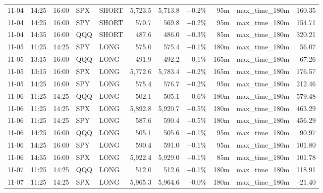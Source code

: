 \documentclass[11pt,a4paper,twoside]{article}
\begin{document}
\begin{center}
\begin{longtable}{>{\color{txtmain}}l l l l l r r r r >{\color{txtmain}}l r}
11-04 & 14:25 & 16:00 & SPX & SHORT & 5,723.5 & 5,713.8 & \textcolor{wingreen}{+0.2\%} & 95m & max\_time\_180m & \textcolor{wingreen}{160.35} \\
11-04 & 14:25 & 16:00 & SPY & SHORT & 570.7 & 569.8 & \textcolor{wingreen}{+0.2\%} & 95m & max\_time\_180m & \textcolor{wingreen}{154.71} \\
11-04 & 14:35 & 16:00 & QQQ & SHORT & 487.6 & 486.0 & \textcolor{wingreen}{+0.3\%} & 85m & max\_time\_180m & \textcolor{wingreen}{320.21} \\
11-05 & 11:25 & 14:25 & SPY & LONG & 575.0 & 575.4 & \textcolor{wingreen}{+0.1\%} & 180m & max\_time\_180m & \textcolor{wingreen}{56.07} \\
11-05 & 13:15 & 16:00 & QQQ & LONG & 491.9 & 492.2 & \textcolor{wingreen}{+0.1\%} & 165m & max\_time\_180m & \textcolor{wingreen}{67.26} \\
11-05 & 13:15 & 16:00 & SPX & LONG & 5,772.6 & 5,783.4 & \textcolor{wingreen}{+0.2\%} & 165m & max\_time\_180m & \textcolor{wingreen}{176.57} \\
11-05 & 14:25 & 16:00 & SPY & LONG & 575.4 & 576.7 & \textcolor{wingreen}{+0.2\%} & 95m & max\_time\_180m & \textcolor{wingreen}{212.46} \\
11-06 & 11:25 & 14:25 & QQQ & LONG & 502.1 & 505.1 & \textcolor{wingreen}{+0.6\%} & 180m & max\_time\_180m & \textcolor{wingreen}{579.48} \\
11-06 & 11:25 & 14:25 & SPX & LONG & 5,892.8 & 5,920.7 & \textcolor{wingreen}{+0.5\%} & 180m & max\_time\_180m & \textcolor{wingreen}{463.29} \\
11-06 & 11:25 & 14:25 & SPY & LONG & 587.6 & 590.4 & \textcolor{wingreen}{+0.5\%} & 180m & max\_time\_180m & \textcolor{wingreen}{456.29} \\
11-06 & 14:25 & 16:00 & QQQ & LONG & 505.1 & 505.6 & \textcolor{wingreen}{+0.1\%} & 95m & max\_time\_180m & \textcolor{wingreen}{90.97} \\
11-06 & 14:25 & 16:00 & SPY & LONG & 590.4 & 591.0 & \textcolor{wingreen}{+0.1\%} & 95m & max\_time\_180m & \textcolor{wingreen}{101.80} \\
11-06 & 14:35 & 16:00 & SPX & LONG & 5,922.4 & 5,929.0 & \textcolor{wingreen}{+0.1\%} & 85m & max\_time\_180m & \textcolor{wingreen}{101.78} \\
11-07 & 11:25 & 14:25 & QQQ & LONG & 512.0 & 512.6 & \textcolor{wingreen}{+0.1\%} & 180m & max\_time\_180m & \textcolor{wingreen}{118.91} \\
11-07 & 11:25 & 14:25 & SPX & LONG & 5,965.3 & 5,964.6 & \textcolor{lossred}{-0.0\%} & 180m & max\_time\_180m & \textcolor{lossred}{-21.40} \\

\end{longtable}
\end{center}
\end{document}
